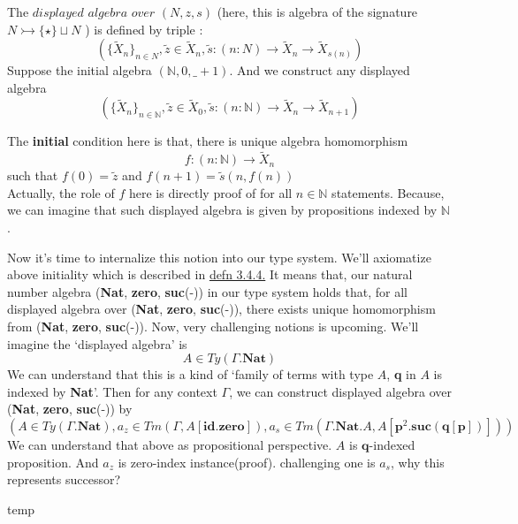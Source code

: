 \documentclass[12pt, a4paper, openany, twoside]{book}
\theoremstyle{definition}
\theoremstyle{remark}
\theoremstyle{plain}
\numberwithin{equation}{section}
\begin{document}
\begin{tcolorbox}[breakable, colback=yellow!10!white,colframe=green!75!black,title=Definition 3.4.4.]\hypertarget{defn 3.4.4.}{}
The $displayed$ $algebra$ $over$ $(N, z, s)$ (here, this is algebra of the signature $N \rightarrowtail \{\star\} \sqcup N$ ) is defined by triple : 
\[(\{\tilde{X}_n\}_{n \in N}, \tilde{z} \in \tilde{X}_n, \tilde{s} : (n : N) \rightarrow \tilde{X}_n \rightarrow \tilde{X}_{s(n)})\]
Suppose the initial algebra $(\mathbb{N}, 0, \_ + 1)$. And we construct any displayed algebra 
\[\left( \{\tilde{X}_n\}_{n \in \mathbb{N}}, \tilde{z} \in \tilde{X}_0, \tilde{s} : (n : \mathbb{N}) \rightarrow \tilde{X}_n \rightarrow \tilde{X}_{n+1} \right) \]

The \textbf{initial} condition here is that, there is unique algebra homomorphism 
\[f : (n : \mathbb{N}) \rightarrow \tilde{X}_n\]
such that $f(0) = \tilde{z}$ and $f(n+1) = \tilde{s}(n, f(n))$
\\
Actually, the role of $f$ here is directly proof of for all $n \in \mathbb{N}$ statements. 
Because, we can imagine that such displayed algebra is given by propositions indexed by $\mathbb{N}$. 
\end{tcolorbox}
\noindent Now it's time to internalize this notion into our type system. 
We'll axiomatize above initiality which is described in \hyperlink{defn 3.4.4.}{defn 3.4.4.}
It means that, our natural number algebra (\textbf{Nat}, \textbf{zero}, \textbf{suc}(-)) in our type system 
holds that, for all displayed algebra over (\textbf{Nat}, \textbf{zero}, \textbf{suc}(-)), there exists unique homomorphism from (\textbf{Nat}, \textbf{zero}, \textbf{suc}(-)). 
Now, very challenging notions is upcoming. We'll imagine the \lq displayed algebra' is 
\[A \in Ty(\Gamma.\mathbf{Nat})\]
We can understand that this is a kind of \lq family of terms with type $A$, \textbf{q} in $A$ is indexed by \textbf{Nat}'. 
Then for any context $\Gamma$, we can construct displayed algebra over (\textbf{Nat}, \textbf{zero}, \textbf{suc}(-)) by 
\[\left(A \in Ty(\Gamma.\mathbf{Nat}), a_z \in Tm(\Gamma, A[\mathbf{id.zero}]), a_s \in Tm(\Gamma.\mathbf{Nat}.A, A[\mathbf{p}^2.\mathbf{suc}(\mathbf{q}[\mathbf{p}])])\right)\]
We can understand that above as propositional perspective. $A$ is $\mathbf{q}$-indexed proposition. 
And $a_z$ is zero-index instance(proof). challenging one is $a_s$, why this represents successor? 


\newpage
temp 
\end{document}
